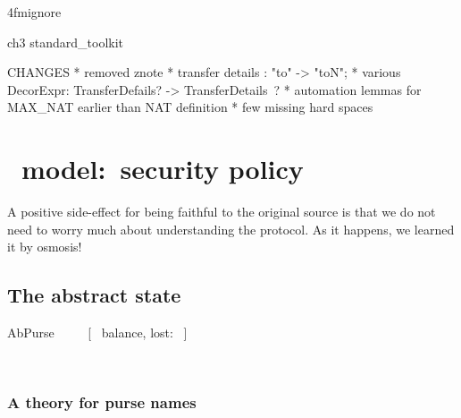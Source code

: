 \ai4fmignore{
\begin{zsection}
  \SECTION ch3 \parents standard\_toolkit
\end{zsection}
CHANGES
* removed znote 
* transfer details :  "to" -> "toN"; 
* various DecorExpr: TransferDefails? -> TransferDetails~?
* automation lemmas for MAX_NAT earlier than NAT definition
* few missing hard spaces
}

\chapter{\Abs\ model:~security policy}\label{ch3}

A positive side-effect for being faithful to the
original source is that we do not need to worry
much about understanding the protocol. As it happens,
we learned it by osmosis!

\section{The abstract state}\label{ch3.abstractState}

\begin{LSDef}
\begin{zed}
   AbPurse ~~~~ [~ balance, lost: \nat ~]
\end{zed}~\end{LSDef}

\subsection{A theory for purse names}\label{ch3.pursenames}

